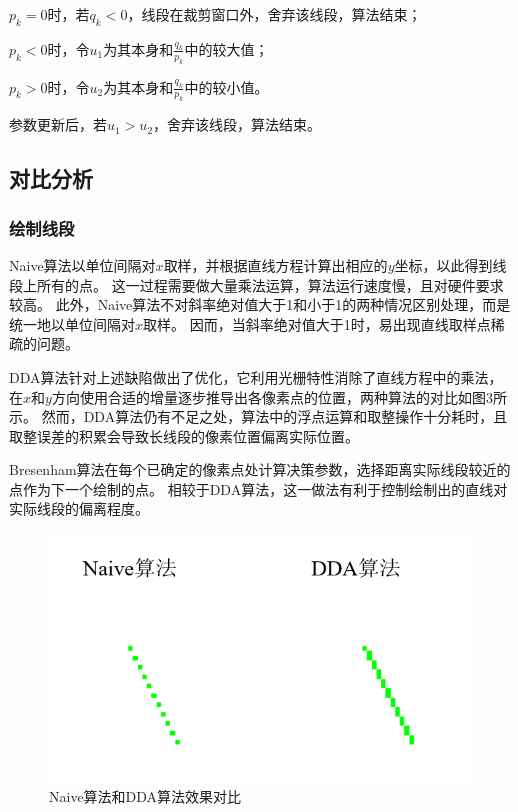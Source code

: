 \documentclass[a4paper,UTF8]{article}
\theoremstyle{definition}
\begin{document}
$p_k=0$时，若$q_k<0$，线段在裁剪窗口外，舍弃该线段，算法结束；

$p_k<0$时，令$u_1$为其本身和$\frac{q_k}{p_k}$中的较大值；

$p_k>0$时，令$u_2$为其本身和$\frac{q_k}{p_k}$中的较小值。

参数更新后，若$u_1>u_2$，舍弃该线段，算法结束。


        
\subsection{对比分析}
\subsubsection{绘制线段}
Naive算法以单位间隔对$x$取样，并根据直线方程计算出相应的$y$坐标，以此得到线段上所有的点。
这一过程需要做大量乘法运算，算法运行速度慢，且对硬件要求较高。
此外，Naive算法不对斜率绝对值大于1和小于1的两种情况区别处理，而是统一地以单位间隔对$x$取样。
因而，当斜率绝对值大于1时，易出现直线取样点稀疏的问题。

DDA算法针对上述缺陷做出了优化，它利用光栅特性消除了直线方程中的乘法，在$x$和$y$方向使用合适的增量逐步推导出各像素点的位置，两种算法的对比如图3所示。
然而，DDA算法仍有不足之处，算法中的浮点运算和取整操作十分耗时，且取整误差的积累会导致长线段的像素位置偏离实际位置。

Bresenham算法在每个已确定的像素点处计算决策参数，选择距离实际线段较近的点作为下一个绘制的点。
相较于DDA算法，这一做法有利于控制绘制出的直线对实际线段的偏离程度。

\begin{figure}[H]
    \centering
    \includegraphics[scale=0.6]{naive-vs-dda.PNG}
    \caption{Naive算法和DDA算法效果对比}
\end{figure}
\end{document}
